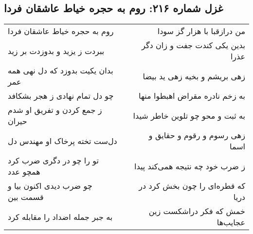 \begin{center}
\section*{غزل شماره ۲۱۶: روم به حجره خیاط عاشقان فردا}
\label{sec:0216}
\begin{longtable}{l p{0.5cm} r}
روم به حجره خیاط عاشقان فردا
&&
من درازقبا با هزار گز سودا
\\
ببردت ز یزید و بدوزدت بر زید
&&
بدین یکی کندت جفت و زان دگر عذرا
\\
بدان یکیت بدوزد که دل نهی همه عمر
&&
زهی بریشم و بخیه زهی ید بیضا
\\
چو دل تمام نهادی ز هجر بشکافد
&&
به زخم نادره مقراض اهبطوا منها
\\
ز جمع کردن و تفریق او شدم حیران
&&
به ثبت و محو چو تلوین خاطر شیدا
\\
دل‌ست تخته پرخاک او مهندس دل
&&
زهی رسوم و رقوم و حقایق و اسما
\\
تو را چو در دگری ضرب کرد همچو عدد
&&
ز ضرب خود چه نتیجه همی‌کند پیدا
\\
چو ضرب دیدی اکنون بیا و قسمت بین
&&
که قطره‌ای را چون بخش کرد در دریا
\\
به جبر جمله اضداد را مقابله کرد
&&
خمش که فکر دراشکست زین عجایب‌ها
\\
\end{longtable}
\end{center}
